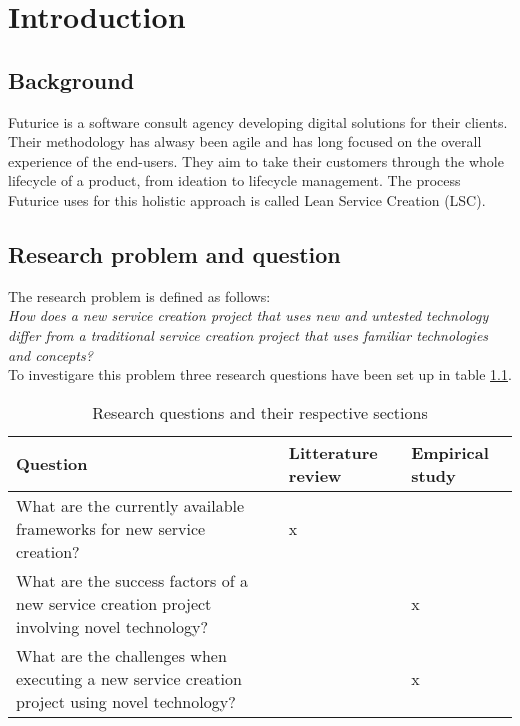 \chapter{Introduction}
\label{chapter:intro}

\section{Background}
\label{section:background}

Futurice is a software consult agency developing digital solutions for their clients. Their methodology has alwasy been agile and has long focused on the overall experience of the end-users. They aim to take their customers through the whole lifecycle of a product, from ideation to lifecycle management. The process Futurice uses for this holistic approach is called Lean Service Creation (LSC).


\section{Research problem and question}
\label{section:problem}

The research problem is defined as follows:\\

\textit{How does a new service creation project that uses new and untested technology differ from a traditional service creation project that uses familiar technologies and concepts?}\\

To investigare this problem three research questions have been set up in table \ref{tbl:questions}.


\begin{table}
  \begin{tabular}{p{200pt} | p{70pt} | p{70pt}}
    Question & Litterature review & Empirical study \\
    \hline
    What are the currently available frameworks for new service creation? & x & \\
    What are the success factors of a new service creation project involving novel technology? &  & x \\
    What are the challenges when executing a new service creation project using novel technology? &  & x \\
  \end{tabular}
  \caption{Research questions and their respective sections}
  \label{tbl:questions}
\end{table}

